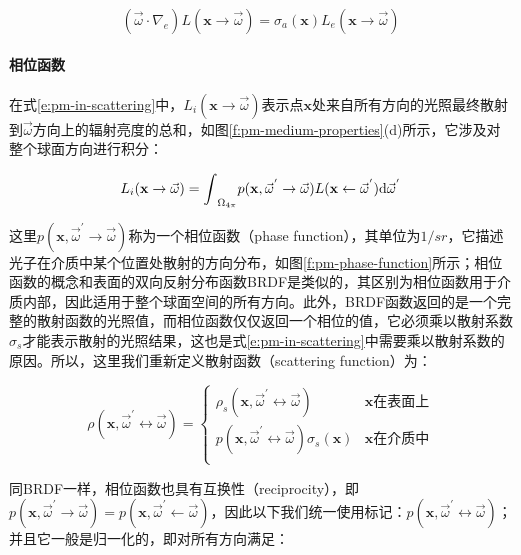 \begin{equation}\label{e:pm-emission}
	(\vec{\omega}\cdot\nabla_e)L(\mathbf{x}\to\vec{\omega})=
	\sigma_a(\mathbf{x})L_e(\mathbf{x}\to\vec{\omega})
\end{equation}




\paragraph{相位函数}
在式\ref{e:pm-in-scattering}中，$L_i(\mathbf{x}\to\vec{\omega})$表示点$\mathbf{x}$处来自所有方向的光照最终散射到$\vec{\omega}$方向上的辐射亮度的总和，如图\ref{f:pm-medium-properties}(d)所示，它涉及对整个球面方向进行积分：

\begin{equation}
	L_i(\mathbf{x}\to\vec{\omega})={\rm \int}_{\Omega_{4\pi}}p(\mathbf{x},\vec{\omega}^{'}\to\vec{\omega})L(\mathbf{x}\leftarrow\vec{\omega}^{'}){\rm d}\vec{\omega}^{'}
\end{equation}

\noindent 这里$p(\mathbf{x},\vec{\omega}^{'}\to\vec{\omega})$称为一个相位函数（phase function），其单位为$1/sr$，它描述光子在介质中某个位置处散射的方向分布，如图\ref{f:pm-phase-function}所示；相位函数的概念和表面的双向反射分布函数BRDF是类似的，其区别为相位函数用于介质内部，因此适用于整个球面空间的所有方向。此外，BRDF函数返回的是一个完整的散射函数的光照值，而相位函数仅仅返回一个相位的值，它必须乘以散射系数$\sigma_s$才能表示散射的光照结果，这也是式\ref{e:pm-in-scattering}中需要乘以散射系数的原因。所以，这里我们重新定义散射函数（scattering function）为：

\begin{equation}\label{e:pm-scattering}
\rho(\mathbf{x},\vec{\omega}^{'}\leftrightarrow\vec{\omega})=\begin{cases}
	\rho_s(\mathbf{x},\vec{\omega}^{'}\leftrightarrow\vec{\omega})&\text{$\mathbf{x}$在表面上}\\
	p(\mathbf{x},\vec{\omega}^{'}\leftrightarrow\vec{\omega})\sigma_s(\mathbf{x})&\text{$\mathbf{x}$在介质中}\\
\end{cases}
\end{equation}

同BRDF一样，相位函数也具有互换性（reciprocity），即$p(\mathbf{x},\vec{\omega}^{'}\to\vec{\omega})=p(\mathbf{x},\vec{\omega}^{'}\leftarrow\vec{\omega})$，因此以下我们统一使用标记：$p(\mathbf{x},\vec{\omega}^{'}\leftrightarrow\vec{\omega})$；并且它一般是归一化的，即对所有方向满足：

